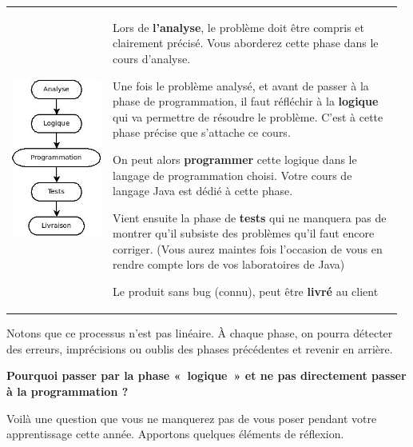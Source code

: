 	\begin{tabular}{m{0.25\linewidth}m{0.72\linewidth}}
	\includegraphics[width=3.5cm]{image/intro-phases-develop}
	&
	\begin{liste}
	\item 
		Lors de \textbf{l'analyse}, le problème doit être
		compris et clairement précisé. Vous aborderez cette phase dans le cours
		d'analyse.
	\item
		Une fois le problème analysé, et avant de passer à la phase de
		programmation, il faut réfléchir à la \textbf{logique} qui va permettre
		de résoudre le problème. C'est à cette phase précise
		que s'attache ce cours.
	\item
		On peut alors \textbf{programmer} cette logique dans le langage de
		programmation choisi. Votre cours de langage Java est dédié à cette
		phase.
	\item
		Vient ensuite la phase de \textbf{tests} qui ne manquera pas de montrer
		qu'il subsiste des problèmes qu'il
		faut encore corriger. (Vous aurez maintes fois
		l'occasion de vous en rendre compte lors de vos
		laboratoires de Java)
	\item
		Le produit sans bug (connu), peut être \textbf{livré} au client
	\end{liste}
	\\
	\end{tabular}
	
	Notons que ce processus n'est pas linéaire. À chaque
	phase, on pourra détecter des erreurs, imprécisions ou oublis des
	phases précédentes et revenir en arrière.

	\textbf{Pourquoi passer par la phase «~logique~» 
		et ne pas directement passer à la programmation ?}
	
	Voilà une question que vous ne manquerez pas de vous poser pendant votre
	apprentissage cette année. Apportons quelques éléments de réflexion.

